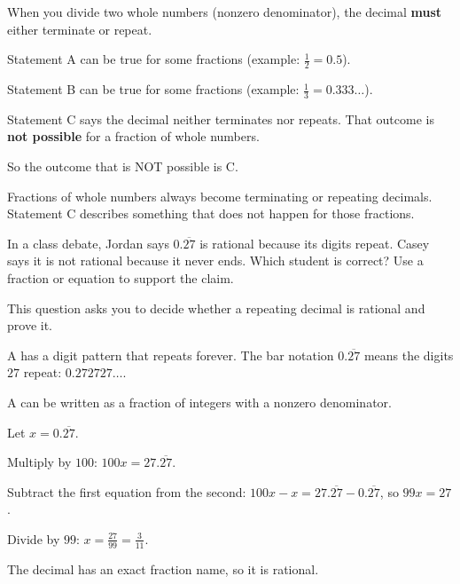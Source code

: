 \begin{steps}
  \item When you divide two whole numbers (nonzero denominator), the decimal \textbf{must} either
        terminate or repeat.
  \item Statement A can be true for some fractions (example: $\tfrac{1}{2} = 0.5$).
  \item Statement B can be true for some fractions (example: $\tfrac{1}{3} = 0.333\ldots$).
  \item Statement C says the decimal neither terminates nor repeats. That outcome is
        \textbf{not possible} for a fraction of whole numbers.
  \item So the outcome that is NOT possible is C.
\end{steps}


\noindent Fractions of whole numbers always become terminating or repeating
decimals. Statement C describes something that does not happen for those
fractions.


\noindent In a class debate, Jordan says $0.\overline{27}$ is rational because
its digits repeat. Casey says it is not rational because it never ends. Which
student is correct? Use a fraction or equation to support the claim.


\noindent This question asks you to decide whether a repeating decimal is rational and prove it.

\begin{words}
  \item A has a digit pattern that repeats forever. The bar notation $0.\overline{27}$ means the digits $27$ repeat: $0.272727\ldots$.
  \item A can be written as a fraction of integers with a nonzero denominator.
\end{words}

\begin{steps}
  \item Let $x = 0.\overline{27}$.
  \item Multiply by $100$: $100x = 27.\overline{27}$.
  \item Subtract the first equation from the second: $100x - x = 27.\overline{27} - 0.\overline{27}$, so $99x = 27$.
  \item Divide by $99$: $x = \tfrac{27}{99} = \tfrac{3}{11}$.
\end{steps}


\noindent The decimal has an exact fraction name, so it is rational.
